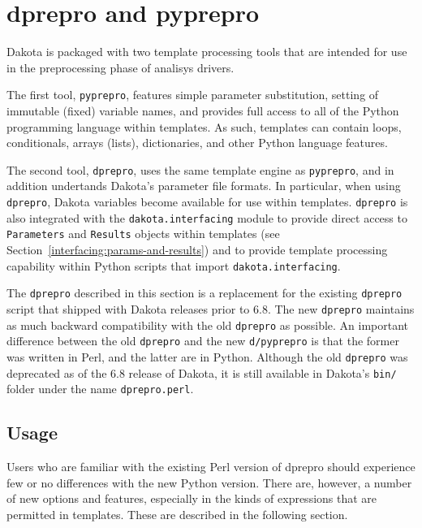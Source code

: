 \section{dprepro and pyprepro}\label{interfaces:dprepro-and-pyprepro}

Dakota is packaged with two template processing tools that are
intended for use in the preprocessing phase of analisys drivers.

The first tool, \texttt{pyprepro}, features simple parameter 
substitution, setting of immutable (fixed) variable names, and 
provides full access to all of the Python programming language
within templates. As such, templates can contain loops, 
conditionals, arrays (lists), dictionaries, and other Python language 
features.

The second tool, \texttt{dprepro}, uses the same template engine
as \texttt{pyprepro}, and in addition undertands Dakota's parameter
file formats. In particular, when using \texttt{dprepro}, Dakota variables 
become available for use within templates. \texttt{dprepro} is also integrated
with the \texttt{dakota.interfacing} module to provide direct access
to \texttt{Parameters} and \texttt{Results} objects within templates 
(see Section~\ref{interfacing:params-and-results}) and to provide template 
processing capability within Python scripts that import 
\texttt{dakota.interfacing}.

The \texttt{dprepro} described in this section is a replacement for the existing
\texttt{dprepro} script that shipped with Dakota releases prior to 6.8. The 
new \texttt{dprepro} maintains as much backward compatibility with the old 
\texttt{dprepro} as possible. An important difference between the old 
\texttt{dprepro} and the new \texttt{d/pyprepro} is that the former was written 
in Perl, and the latter are in Python. Although the old \texttt{dprepro} was deprecated 
as of the 6.8 release of Dakota, it is still available in Dakota's \texttt{bin/} folder 
under the name \texttt{dprepro.perl}.

\subsection{Usage}\label{interfaces:dprepro-usage}

Users who are familiar with the existing Perl version of dprepro should
experience few or no differences with the new Python version. There are,
however, a number of new options and features, especially in the kinds of
expressions that are permitted in templates. These are described in
the following section.

